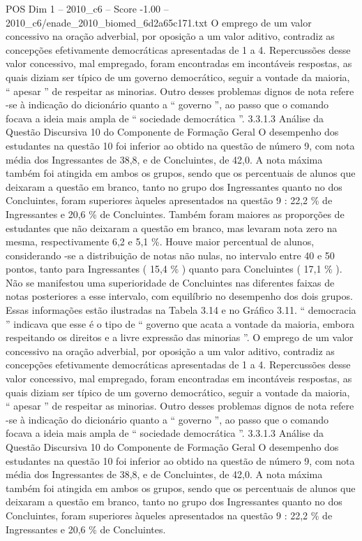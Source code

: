\begin{textsample}{POS Dim 1 – 2010\_c6 – Score -1.00 – 2010\_c6/enade\_2010\_biomed\_6d2a65c171.txt}
O emprego de um valor concessivo na oração adverbial, por oposição a um valor aditivo, contradiz as concepções efetivamente democráticas apresentadas de 1 a 4.
Repercussões desse valor concessivo, mal empregado, foram encontradas em incontáveis respostas, as quais diziam ser típico de um governo democrático, seguir a vontade da maioria, “ apesar ” de respeitar as minorias.
Outro desses problemas dignos de nota refere -se à indicação do dicionário quanto a “ governo ”, ao passo que o comando focava a ideia mais ampla de “ sociedade democrática ”. 3.3.1.3 Análise da Questão Discursiva 10 do Componente de Formação Geral O desempenho dos estudantes na questão 10 foi inferior ao obtido na questão de número 9, com nota média dos Ingressantes de 38,8, e de Concluintes, de 42,0.
A nota máxima também foi atingida em ambos os grupos, sendo que os percentuais de alunos que deixaram a questão em branco, tanto no grupo dos Ingressantes quanto no dos Concluintes, foram superiores àqueles apresentados na questão 9 : 22,2 \% de Ingressantes e 20,6 \% de Concluintes.
Também foram maiores as proporções de estudantes que não deixaram a questão em branco, mas levaram nota zero na mesma, respectivamente 6,2 e 5,1 \%.
Houve maior percentual de alunos, considerando -se a distribuição de notas não nulas, no intervalo entre 40 e 50 pontos, tanto para Ingressantes ( 15,4 \% ) quanto para Concluintes ( 17,1 \% ).
Não se manifestou uma superioridade de Concluintes nas diferentes faixas de notas posteriores a esse intervalo, com equilíbrio no desempenho dos dois grupos.
Essas informações estão ilustradas na Tabela 3.14 e no Gráfico 3.11. “ democracia ” indicava que esse é o tipo de “ governo que acata a vontade da maioria, embora respeitando os direitos e a livre expressão das minorias ”.
O emprego de um valor concessivo na oração adverbial, por oposição a um valor aditivo, contradiz as concepções efetivamente democráticas apresentadas de 1 a 4.
Repercussões desse valor concessivo, mal empregado, foram encontradas em incontáveis respostas, as quais diziam ser típico de um governo democrático, seguir a vontade da maioria, “ apesar ” de respeitar as minorias.
Outro desses problemas dignos de nota refere -se à indicação do dicionário quanto a “ governo ”, ao passo que o comando focava a ideia mais ampla de “ sociedade democrática ”. 3.3.1.3 Análise da Questão Discursiva 10 do Componente de Formação Geral O desempenho dos estudantes na questão 10 foi inferior ao obtido na questão de número 9, com nota média dos Ingressantes de 38,8, e de Concluintes, de 42,0.
A nota máxima também foi atingida em ambos os grupos, sendo que os percentuais de alunos que deixaram a questão em branco, tanto no grupo dos Ingressantes quanto no dos Concluintes, foram superiores àqueles apresentados na questão 9 : 22,2 \% de Ingressantes e 20,6 \% de Concluintes.

\end{textsample}

